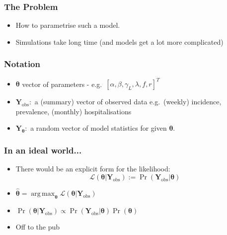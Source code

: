 \documentclass{beamer}
\DeclareMathOperator*{\argmax}{arg\,max}
\begin{document}
\begin{frame}
    \frametitle{The Problem}
    \begin{itemize}
        \item How to parametrise such a model.
        \item <2-> Simulations take long time (and models get a lot more
              complicated)
    \end{itemize}
\end{frame}

\begin{frame}
    \frametitle{Notation}
    \begin{itemize}
        \item $\bm{\theta}$ vector of parameters
              - e.g.\ $[\alpha, \beta, \gamma_L, \lambda, f, r]^T$
        \item $\mathbf{Y}_\text{obs}:$ a (summary) vector of observed data
              e.g.\ (weekly) incidence, prevalence, (monthly) hospitalisations
        \item <2->$\mathbf{Y}_{\bm{\theta}}:$ a random vector
              of model statistics for given $\bm{\theta}.$
    \end{itemize}
\end{frame}

\begin{frame}
    \frametitle{In an ideal world...}
    \begin{itemize}
        \item There would be an explicit form for the likelihood:
              $$
                  \mathcal{L}(\bm{\theta}|\mathbf{Y}_\text{obs})
                  := \Pr(\mathbf{Y}_\text{obs} | \bm{\theta})
              $$
        \item <2-> $\hat{\bm{\theta}} = \argmax_{\bm{\theta}} \mathcal{L}(\bm{\theta}|\mathbf{Y}_\text{obs})$
        \item <3-> $\Pr(\bm{\theta}|\mathbf{Y}_\text{obs}) \propto \Pr(\mathbf{Y}_\text{obs}| \bm\theta)\Pr(\bm{\theta})$
        \item <4-> Off to the pub
    \end{itemize}
\end{frame}
\end{document}
